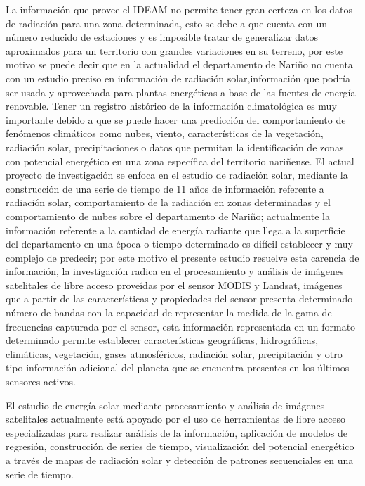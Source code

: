 La información que provee el IDEAM no permite tener gran certeza en los datos de radiación para una zona determinada, esto se debe a que cuenta con 
un número reducido de estaciones y es imposible tratar de generalizar datos aproximados para un territorio con grandes variaciones en su terreno, por este motivo
se puede decir que en la actualidad el departamento de Nariño no cuenta con un estudio preciso en información de radiación solar,información que podría 
ser usada y aprovechada para plantas energéticas a base de las fuentes de energía renovable. Tener un registro histórico de 
la información climatológica es muy importante debido a que se puede hacer una predicción del comportamiento de fenómenos climáticos como nubes, viento, 
características de la vegetación, radiación solar, precipitaciones o datos que permitan la identificación de zonas con potencial 
energético en una zona específica del territorio nariñense. El actual proyecto de investigación se enfoca 
en el estudio de radiación solar, mediante la construcción de una serie de tiempo de 11 años de información referente a 
radiación solar, comportamiento de la radiación en zonas determinadas y el comportamiento de nubes sobre el 
departamento de Nariño; actualmente la información referente a la cantidad de energía radiante que llega a la superficie del 
departamento en una época o tiempo determinado es difícil establecer y muy complejo de predecir; por este motivo el presente 
estudio resuelve esta carencia de información, la investigación radica en el procesamiento y análisis de imágenes 
satelitales  de libre acceso proveídas por el sensor MODIS y Landsat, imágenes que a partir de las características y propiedades
del sensor presenta determinado número de bandas con la capacidad de representar la medida de la gama de frecuencias capturada 
por el sensor, esta información representada en un formato determinado permite establecer características geográficas, hidrográficas, 
climáticas, vegetación, gases atmosféricos, radiación solar, precipitación y otro tipo información adicional del planeta
que se encuentra presentes en los últimos sensores activos. 

El estudio de energía solar mediante procesamiento y análisis de imágenes satelitales actualmente está 
apoyado por el uso de herramientas de libre acceso especializadas para realizar análisis de la información, aplicación de modelos
de regresión, construcción de series de tiempo, visualización del potencial energético a través de mapas de radiación solar 
y detección de patrones secuenciales en una serie de tiempo.

